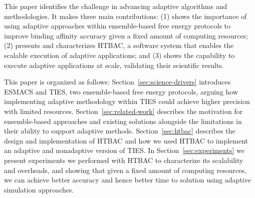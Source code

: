This paper identifies the challenge in advancing adaptive algorithms and
methodologies. It makes three main contributions: (1) shows the importance of using
adaptive approaches within ensemble-based free energy protocols to improve
binding affinity accuracy given a fixed amount of computing resources; (2)
presents and characterizes HTBAC, a software system that enables the scalable
execution of adaptive applications; and (3) shows the capability to execute
adaptive applications at scale, validating their scientific results.
%

This paper is organized as follows: Section~\ref{sec:science-drivers}
introduces ESMACS and TIES, two ensemble-based free energy protocols, arguing
how implementing adaptive methodology within TIES could achieve higher
precision with limited resources. Section~\ref{sec:related-work} describes
the motivation for ensemble-based approaches and existing solutions alongside
the limitations in their ability to support adaptive methods.
Section~\ref{sec:htbac} describes the design and implementation of HTBAC and
how we used HTBAC to implement an adaptive and nonadaptive version of TIES. In 
Section~\ref{sec:experiments} we present experiments we 
performed with HTBAC to characterize its scalability and overheads, and showing 
that given a fixed amount of computing resources, we can achieve better accuracy 
and hence better time to solution using adaptive simulation approaches.



